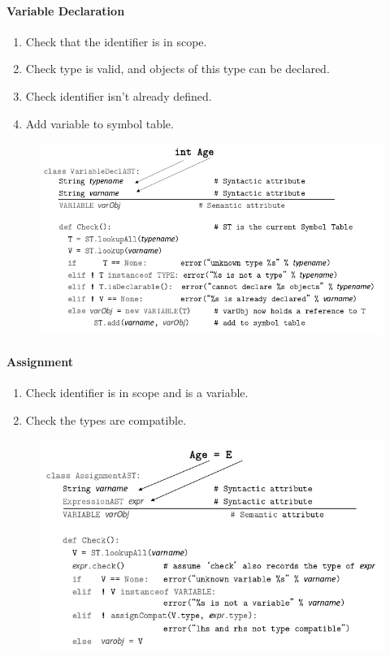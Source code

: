 \documentclass[twocolumn,english]{article}
\begin{document}
\paragraph{Variable Declaration}
\begin{enumerate}
\item Check that the identifier is in scope. 
\item Check type is valid, and objects of this type can be declared. 
\item Check identifier isn't already defined. 
\item Add variable to symbol table. 
\end{enumerate}
\begin{figure}[H]
\centering{}\includegraphics[width=0.8\linewidth]{img/var-declaration} 
\end{figure}

\paragraph{Assignment}
\begin{enumerate}
\item Check identifier is in scope and is a variable. 
\item Check the types are compatible. 
\end{enumerate}
\begin{figure}[H]
\centering{}\includegraphics[width=0.75\linewidth]{img/assignment} 
\end{figure}
\end{document}
